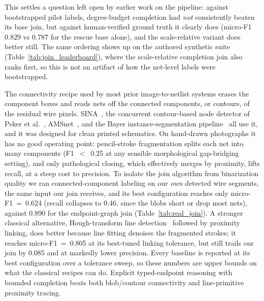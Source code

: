 \documentclass{ieeeaccess}
\begin{document}
This settles a question left open by earlier work on the pipeline: against bootstrapped pilot labels, degree-budget completion had \emph{not} consistently beaten its base join, but against human-verified ground truth it clearly does (micro-F1 0.829 vs 0.787 for the rescue base alone), and the scale-relative variant does better still. The same ordering shows up on the authored synthetic suite (Table~\ref{tab:join_leaderboard}), where the scale-relative completion join also ranks first, so this is not an artifact of how the net-level labels were bootstrapped.

The connectivity recipe used by most prior image-to-netlist systems erases the component boxes and reads nets off the connected components, or contours, of the residual wire pixels. SINA~\cite{sina2026}, the concurrent contour-based node detector of Peker et al.~\cite{peker2026}, AMSnet~\cite{amsnet2025}, and the Bayer instance-segmentation pipeline~\cite{instanceseg2023} all use it, and it was designed for clean printed schematics. On hand-drawn photographs it has no good operating point: pencil-stroke fragmentation splits each net into many components (F1~$<$~0.25 at any sensible morphological gap-bridging setting), and only pathological closing, which effectively merges by proximity, lifts recall, at a steep cost to precision. To isolate the join algorithm from binarization quality we ran connected-component labeling on our \emph{own} detected wire segments, the same input our join receives, and its best configuration reaches only micro-F1~=~0.624 (recall collapses to 0.46, since the blobs short or drop most nets), against 0.890 for the endpoint-graph join (Table~\ref{tab:real_join}). A stronger classical alternative, Hough-transform line detection~\cite{duda1972hough} followed by proximity linking, does better because line fitting denoises the fragmented strokes; it reaches micro-F1~=~0.805 at its best-tuned linking tolerance, but still trails our join by 0.085 and at markedly lower precision. Every baseline is reported at its best configuration over a tolerance sweep, so these numbers are upper bounds on what the classical recipes can do. Explicit typed-endpoint reasoning with bounded completion beats both blob/contour connectivity and line-primitive proximity tracing.
\end{document}
